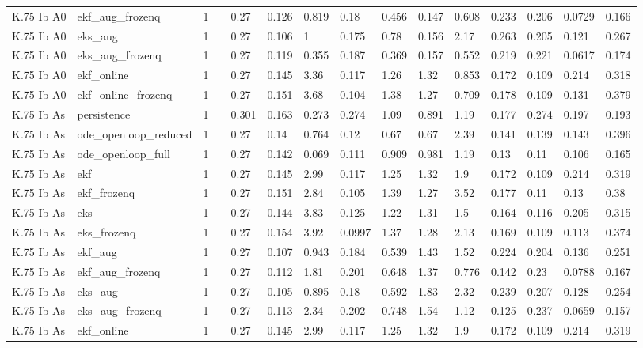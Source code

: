 \begin{table}[t]
\begin{tabular}{lllllllllllllll}
K.75 Ib A0 & ekf\_aug\_frozenq & 1 &  & 0.27 & 0.126 & 0.819 & 0.18 & 0.456 & 0.147 & 0.608 & 0.233 & 0.206 & 0.0729 & 0.166 \\
K.75 Ib A0 & eks\_aug & 1 &  & 0.27 & 0.106 & 1 & 0.175 & 0.78 & 0.156 & 2.17 & 0.263 & 0.205 & 0.121 & 0.267 \\
K.75 Ib A0 & eks\_aug\_frozenq & 1 &  & 0.27 & 0.119 & 0.355 & 0.187 & 0.369 & 0.157 & 0.552 & 0.219 & 0.221 & 0.0617 & 0.174 \\
K.75 Ib A0 & ekf\_online & 1 &  & 0.27 & 0.145 & 3.36 & 0.117 & 1.26 & 1.32 & 0.853 & 0.172 & 0.109 & 0.214 & 0.318 \\
K.75 Ib A0 & ekf\_online\_frozenq & 1 &  & 0.27 & 0.151 & 3.68 & 0.104 & 1.38 & 1.27 & 0.709 & 0.178 & 0.109 & 0.131 & 0.379 \\
K.75 Ib As & persistence & 1 &  & 0.301 & 0.163 & 0.273 & 0.274 & 1.09 & 0.891 & 1.19 & 0.177 & 0.274 & 0.197 & 0.193 \\
K.75 Ib As & ode\_openloop\_reduced & 1 &  & 0.27 & 0.14 & 0.764 & 0.12 & 0.67 & 0.67 & 2.39 & 0.141 & 0.139 & 0.143 & 0.396 \\
K.75 Ib As & ode\_openloop\_full & 1 &  & 0.27 & 0.142 & 0.069 & 0.111 & 0.909 & 0.981 & 1.19 & 0.13 & 0.11 & 0.106 & 0.165 \\
K.75 Ib As & ekf & 1 &  & 0.27 & 0.145 & 2.99 & 0.117 & 1.25 & 1.32 & 1.9 & 0.172 & 0.109 & 0.214 & 0.319 \\
K.75 Ib As & ekf\_frozenq & 1 &  & 0.27 & 0.151 & 2.84 & 0.105 & 1.39 & 1.27 & 3.52 & 0.177 & 0.11 & 0.13 & 0.38 \\
K.75 Ib As & eks & 1 &  & 0.27 & 0.144 & 3.83 & 0.125 & 1.22 & 1.31 & 1.5 & 0.164 & 0.116 & 0.205 & 0.315 \\
K.75 Ib As & eks\_frozenq & 1 &  & 0.27 & 0.154 & 3.92 & 0.0997 & 1.37 & 1.28 & 2.13 & 0.169 & 0.109 & 0.113 & 0.374 \\
K.75 Ib As & ekf\_aug & 1 &  & 0.27 & 0.107 & 0.943 & 0.184 & 0.539 & 1.43 & 1.52 & 0.224 & 0.204 & 0.136 & 0.251 \\
K.75 Ib As & ekf\_aug\_frozenq & 1 &  & 0.27 & 0.112 & 1.81 & 0.201 & 0.648 & 1.37 & 0.776 & 0.142 & 0.23 & 0.0788 & 0.167 \\
K.75 Ib As & eks\_aug & 1 &  & 0.27 & 0.105 & 0.895 & 0.18 & 0.592 & 1.83 & 2.32 & 0.239 & 0.207 & 0.128 & 0.254 \\
K.75 Ib As & eks\_aug\_frozenq & 1 &  & 0.27 & 0.113 & 2.34 & 0.202 & 0.748 & 1.54 & 1.12 & 0.125 & 0.237 & 0.0659 & 0.157 \\
K.75 Ib As & ekf\_online & 1 &  & 0.27 & 0.145 & 2.99 & 0.117 & 1.25 & 1.32 & 1.9 & 0.172 & 0.109 & 0.214 & 0.319 \\

\end{tabular}
\end{table}
